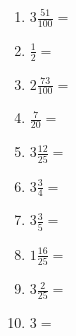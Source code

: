 \documentclass[12pt]{article}
\begin{document}
\begin{enumerate}
\newpage
\item \large $ 3 \frac{51}{100} = $ \vspace{1.5cm}
\item \large $ \frac{1}{2} = $ \vspace{1.5cm}
\item \large $ 2 \frac{73}{100} = $ \vspace{1.5cm}
\item \large $ \frac{7}{20} = $ \vspace{1.5cm}
\item \large $ 3 \frac{12}{25} = $ \vspace{1.5cm}
\item \large $ 3 \frac{3}{4} = $ \vspace{1.5cm}
\item \large $ 3 \frac{3}{5} = $ \vspace{1.5cm}
\item \large $ 1 \frac{16}{25} = $ \vspace{1.5cm}
\item \large $ 3 \frac{2}{25} = $ \vspace{1.5cm}
\item \large $ 3 = $ \vspace{1.5cm}
\end{enumerate}\newpage
\end{document}
